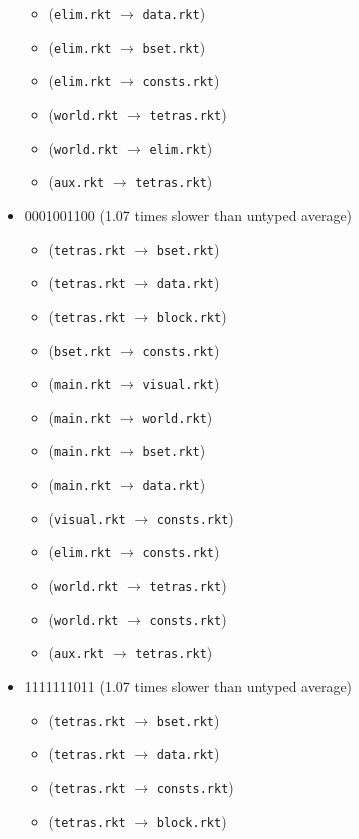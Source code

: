 \documentclass{article}
\newcommand{\mono}[1]{\texttt{#1}}
\begin{document}
\begin{itemize}
\begin{itemize}
  \item (\mono{elim.rkt} $\rightarrow$ \mono{data.rkt})
  \item (\mono{elim.rkt} $\rightarrow$ \mono{bset.rkt})
  \item (\mono{elim.rkt} $\rightarrow$ \mono{consts.rkt})
  \item (\mono{world.rkt} $\rightarrow$ \mono{tetras.rkt})
  \item (\mono{world.rkt} $\rightarrow$ \mono{elim.rkt})
  \item (\mono{aux.rkt} $\rightarrow$ \mono{tetras.rkt})
  \end{itemize}
\item 0001001100 (1.07 times slower than untyped average)
  \begin{itemize}
  \item (\mono{tetras.rkt} $\rightarrow$ \mono{bset.rkt})
  \item (\mono{tetras.rkt} $\rightarrow$ \mono{data.rkt})
  \item (\mono{tetras.rkt} $\rightarrow$ \mono{block.rkt})
  \item (\mono{bset.rkt} $\rightarrow$ \mono{consts.rkt})
  \item (\mono{main.rkt} $\rightarrow$ \mono{visual.rkt})
  \item (\mono{main.rkt} $\rightarrow$ \mono{world.rkt})
  \item (\mono{main.rkt} $\rightarrow$ \mono{bset.rkt})
  \item (\mono{main.rkt} $\rightarrow$ \mono{data.rkt})
  \item (\mono{visual.rkt} $\rightarrow$ \mono{consts.rkt})
  \item (\mono{elim.rkt} $\rightarrow$ \mono{consts.rkt})
  \item (\mono{world.rkt} $\rightarrow$ \mono{tetras.rkt})
  \item (\mono{world.rkt} $\rightarrow$ \mono{consts.rkt})
  \item (\mono{aux.rkt} $\rightarrow$ \mono{tetras.rkt})
  \end{itemize}
\item 1111111011 (1.07 times slower than untyped average)
  \begin{itemize}
  \item (\mono{tetras.rkt} $\rightarrow$ \mono{bset.rkt})
  \item (\mono{tetras.rkt} $\rightarrow$ \mono{data.rkt})
  \item (\mono{tetras.rkt} $\rightarrow$ \mono{consts.rkt})
  \item (\mono{tetras.rkt} $\rightarrow$ \mono{block.rkt})

\end{itemize}
\end{itemize}
\end{document}
